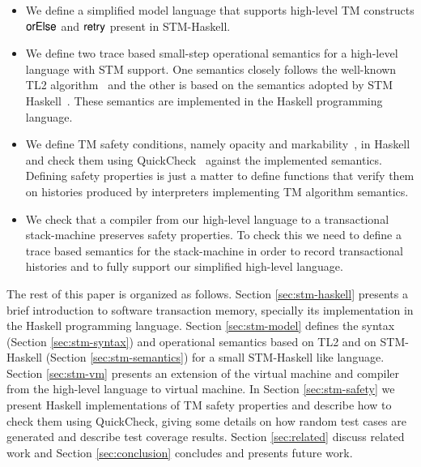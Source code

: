 \documentclass[3p,times,procedia]{elsarticle}
\theoremstyle{definition}
\newcommand{\F}[1]{\green{\mathsf{#1}}}
\begin{document}
\begin{itemize}
   \item We define a simplified model language that supports high-level TM constructs 
         \ensuremath{\F{orElse}} and \ensuremath{\F{retry}} present in STM-Haskell.
   \item We define two trace based small-step operational semantics for a high-level 
         language with STM support. One semantics closely follows the well-known TL2
         algorithm~\cite{Dice06} and the other is based on the semantics adopted by STM Haskell~\cite{Harris05}.
         These semantics are implemented in the Haskell programming language.
   \item We define TM safety conditions, namely opacity and markability~\cite{Guerraoui2008,Doherty2009,Imbs2009,LesaniP14},
         in Haskell and check them using QuickCheck~\cite{Claessen00} against the implemented semantics. Defining safety properties
         is just a matter to define functions that verify them on histories produced by interpreters implementing TM algorithm
         semantics.
    \item We check that a compiler from our high-level language to a transactional
          stack-machine preserves safety properties.
          To check this we need to define a trace based semantics for the stack-machine 
          in order to record transactional histories and to fully support our
          simplified high-level language.
\end{itemize}

The rest of this paper is organized as follows. Section \ref{sec:stm-haskell} presents a brief introduction
to software transaction memory, specially its implementation in the Haskell programming language. Section \ref{sec:stm-model}
defines the syntax (Section \ref{sec:stm-syntax}) and operational semantics
based on TL2 and on STM-Haskell (Section \ref{sec:stm-semantics}) for a small STM-Haskell like language.
Section \ref{sec:stm-vm} presents an extension of the
virtual machine and compiler from the high-level language to virtual machine. In Section \ref{sec:stm-safety}
we present Haskell implementations of TM safety properties and describe how to check them using
QuickCheck, giving some details on how random test cases are generated and describe test coverage results.
Section \ref{sec:related} discuss related work and Section \ref{sec:conclusion} concludes and
presents future work.

\end{document}
